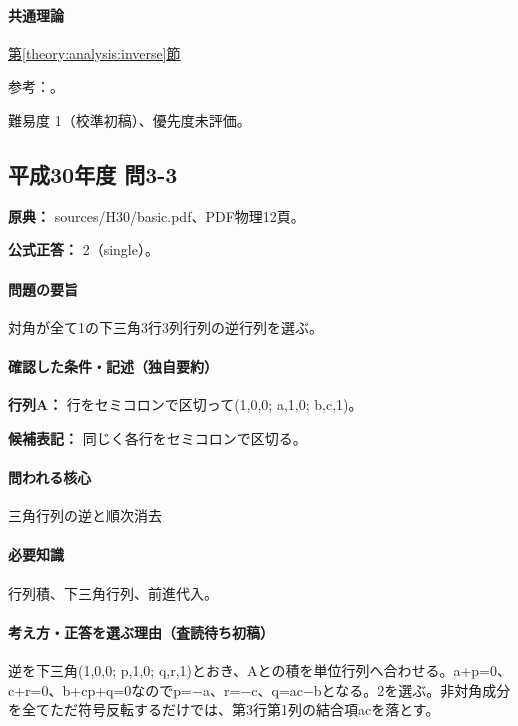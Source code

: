 \paragraph{共通理論} \hyperref[theory:analysis:inverse]{第\ref*{theory:analysis:inverse}節}

\par 参考：\cite{mit_inverse2007}。

\par 難易度 1（校準初稿）、優先度未評価。

\subsection{平成30年度 問3-3}
\label{q:h30-reg-basic-3-3}

\noindent\textbf{原典：} sources/H30/basic.pdf、PDF物理12頁。

\textbf{公式正答：} 2（single）。

\paragraph{問題の要旨} 対角が全て1の下三角3行3列行列の逆行列を選ぶ。

\paragraph{確認した条件・記述（独自要約）}\mbox{}\par

\noindent\textbf{行列A：} 行をセミコロンで区切って(1,0,0; a,1,0; b,c,1)。\par

\noindent\textbf{候補表記：} 同じく各行をセミコロンで区切る。\par

\paragraph{問われる核心} 三角行列の逆と順次消去

\paragraph{必要知識} 行列積、下三角行列、前進代入。

\paragraph{考え方・正答を選ぶ理由（査読待ち初稿）} 逆を下三角(1,0,0; p,1,0; q,r,1)とおき、Aとの積を単位行列へ合わせる。a+p=\allowbreak{}0、c+r=\allowbreak{}0、b+cp+q=\allowbreak{}0なのでp=−a、r=−c、q=\allowbreak{}ac−bとなる。2を選ぶ。非対角成分を全てただ符号反転するだけでは、第3行第1列の結合項acを落とす。

